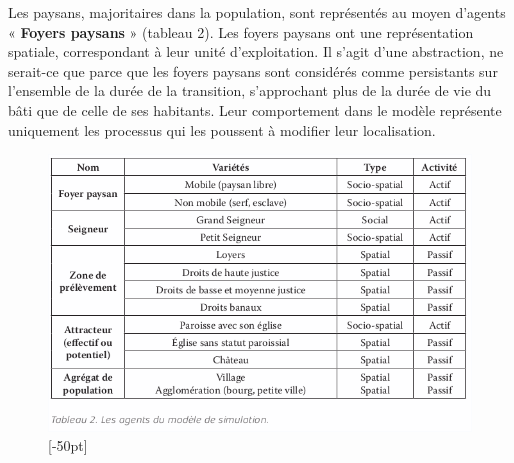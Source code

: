 \documentclass[12pt, a4paper, oneside]{book}
\begin{document}
	Les paysans, majoritaires dans la population, sont représentés au moyen d'agents « \textbf{Foyers paysans} » (tableau 2).
	Les foyers paysans ont une représentation spatiale, correspondant à leur unité d'exploitation.
	Il s'agit d'une abstraction, ne serait-ce que parce que les foyers paysans sont considérés comme persistants sur l'ensemble de la durée de la transition, s'approchant plus de la durée de vie du bâti que de celle de ses habitants.
	Leur comportement dans le modèle représente uniquement les processus qui les poussent à modifier leur localisation.
	
	\begin{figure}[H]
		\centering
		\includegraphics[width=1\linewidth]{src/Chapitre_TMD/Tab2.png}
		[-50pt]
	\end{figure}
	
\end{document}
